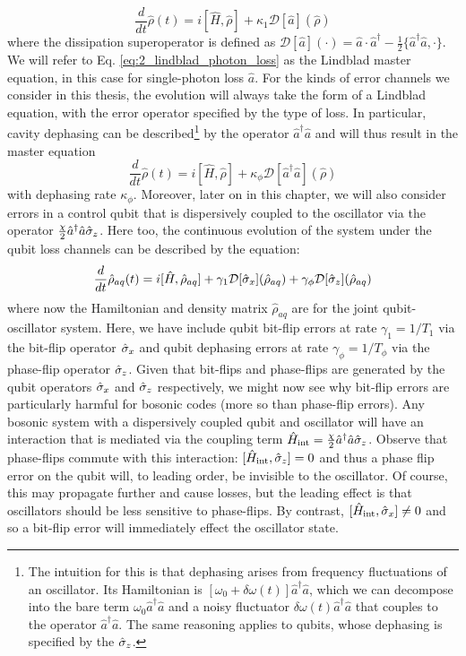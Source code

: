 \begin{equation}
    \frac{d}{dt}\hat{\rho}(t) = i[\hat{H}, \hat{\rho}] + \kappa_1\mathcal{D}[\hat{a}](\hat{\rho})
    \label{eq:2_lindblad_photon_loss}
\end{equation}
where the dissipation superoperator is defined as $\mathcal{D}[\hat{a}](\cdot) = \hat{a}\cdot\hat{a}^\dagger - \frac{1}{2}\{\hat{a}^\dagger\hat{a}, \cdot\}$. We will refer to Eq. \eqref{eq:2_lindblad_photon_loss} as the Lindblad master equation, in this case for single-photon loss $\hat{a}$. For the kinds of error channels we consider in this thesis, the evolution will always take the form of a Lindblad equation, with the error operator specified by the type of loss. In particular, cavity dephasing can be described\footnote{The intuition for this is that dephasing arises from frequency fluctuations of an oscillator. Its Hamiltonian is $[\omega_0 + \delta \omega(t)]\hat{a}^\dagger\hat{a}$, which we can decompose into the bare term $\omega_0 \hat{a}^\dagger\hat{a}$ and a noisy fluctuator $\delta \omega(t)\hat{a}^\dagger\hat{a}$ that couples to the operator $\hat{a}^\dagger\hat{a}$. The same reasoning applies to qubits, whose dephasing is specified by the $\hat{\sigma}_z$.} by the operator $\hat{a}^\dagger\hat{a}$ and will thus result in the master equation 
\begin{equation}
    \frac{d}{dt}\hat{\rho}(t) = i[\hat{H}, \hat{\rho}] + \kappa_\phi\mathcal{D}[\hat{a}^\dagger\hat{a}](\hat{\rho})
\end{equation}
with dephasing rate $\kappa_\phi$. Moreover, later on in this chapter, we will also consider errors in a control qubit that is dispersively coupled to the oscillator via the operator $\frac{\chi}{2}\hat{a}^\dagger\hat{a}\hat{\sigma}_z$. Here too, the continuous evolution of the system under the qubit loss channels can be described by the equation:
\begin{equation}
    \frac{d}{dt}\hat{\rho}_{aq}(t) = i[\hat{H}, \hat{\rho}_{aq}] + \gamma_1\mathcal{D}[\hat{\sigma}_x](\hat{\rho}_{aq}) + \gamma_\phi\mathcal{D}[\hat{\sigma}_z](\hat{\rho}_{aq})
\end{equation}
where now the Hamiltonian and density matrix $\hat{\rho}_{aq}$ are for the joint qubit-oscillator system. Here, we have include qubit bit-flip errors at rate $\gamma_1 = 1/T_1$ via the bit-flip operator $\hat{\sigma}_x$ and qubit dephasing errors at rate $\gamma_\phi = 1/T_\phi$ via the phase-flip operator $\hat{\sigma}_z$. Given that bit-flips and phase-flips are generated by the qubit operators $\hat{\sigma}_x$ and $\hat{\sigma}_z$ respectively, we might now see why bit-flip errors are particularly harmful for bosonic codes (more so than phase-flip errors). Any bosonic system with a dispersively coupled qubit and oscillator will have an interaction that is mediated via the coupling term $\hat{H}_{\rm int} = \frac{\chi}{2}\hat{a}^\dagger\hat{a}\hat{\sigma}_z$. Observe that phase-flips commute with this interaction: $[\hat{H}_{\rm int}, \hat{\sigma}_z] = 0$ and thus a phase flip error on the qubit will, to leading order, be invisible to the oscillator. Of course, this may propagate further and cause losses, but the leading effect is that oscillators should be less sensitive to phase-flips. By contrast, $[\hat{H}_{\rm int}, \hat{\sigma}_x] \neq 0$ and so a bit-flip error will immediately effect the oscillator state. 


